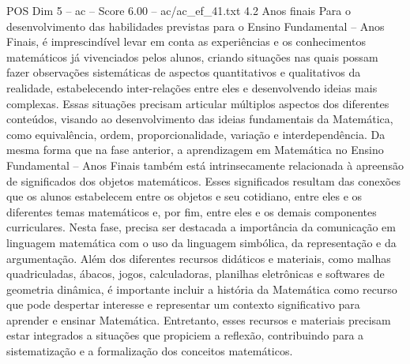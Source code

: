 \begin{textsample}{POS Dim 5 – ac – Score 6.00 – ac/ac\_ef\_41.txt}  \label{ex:f5_pos_127}
4.2 Anos finais Para o desenvolvimento das habilidades previstas para o Ensino Fundamental – Anos Finais, é imprescindível levar em conta as experiências e os conhecimentos matemáticos já vivenciados pelos alunos, criando situações nas quais possam fazer observações sistemáticas de aspectos quantitativos e qualitativos da realidade, estabelecendo inter-relações entre eles e desenvolvendo ideias mais complexas.
Essas situações precisam articular múltiplos aspectos dos diferentes conteúdos, visando ao desenvolvimento das ideias fundamentais da Matemática, como equivalência, ordem, proporcionalidade, variação e interdependência.
Da mesma forma que na fase anterior, a aprendizagem em Matemática no Ensino Fundamental – Anos Finais também está intrinsecamente relacionada à apreensão de significados dos objetos matemáticos.
Esses significados resultam das conexões que os alunos estabelecem entre os objetos e seu cotidiano, entre eles e os diferentes temas matemáticos e, por fim, entre eles e os demais componentes curriculares.
Nesta fase, precisa ser destacada a importância da comunicação em linguagem matemática com o uso da linguagem simbólica, da representação e da argumentação.
Além dos diferentes recursos didáticos e materiais, como malhas quadriculadas, ábacos, jogos, calculadoras, planilhas eletrônicas e softwares de geometria dinâmica, é importante incluir a história da Matemática como recurso que pode despertar interesse e representar um contexto significativo para aprender e ensinar Matemática.
Entretanto, esses recursos e materiais precisam estar integrados a situações que propiciem a reflexão, contribuindo para a sistematização e a formalização dos conceitos matemáticos.

\end{textsample}
